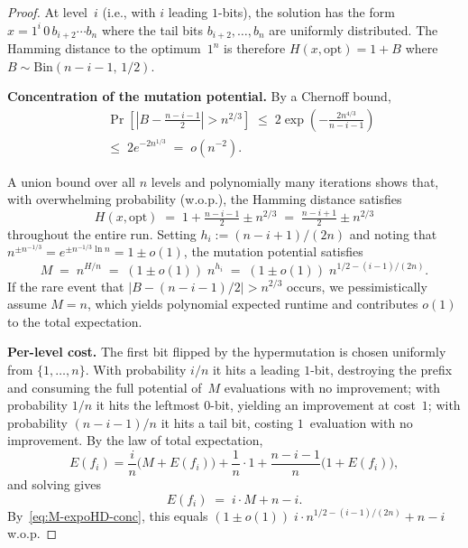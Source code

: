 \documentclass[lettersize,journal]{IEEEtran}
\begin{document}
\begin{proof}
At level~$i$ (i.e., with $i$ leading $1$-bits), the solution has the form
$x = 1^{i}\,0\,b_{i+2}\cdots b_n$ where the tail bits $b_{i+2},\dots,b_n$
are uniformly distributed.
The Hamming distance to the optimum~$1^n$ is therefore
$H(x,\text{opt}) = 1 + B$ where $B\sim\mathrm{Bin}(n-i-1,\,1/2)$.

\medskip
\noindent\textbf{Concentration of the mutation potential.}
By a Chernoff bound,
\begin{align*}
&\Pr\!\left[\left|B - \tfrac{n-i-1}{2}\right| > n^{2/3}\right]
\;\le\; 2\exp\!\left(-\frac{2n^{4/3}}{n-i-1}\right)
\\\;&\le\; 2e^{-2n^{1/3}}
\;=\; o(n^{-2}).
\end{align*}

A union bound over all $n$ levels and polynomially many iterations shows that,
with overwhelming probability (w.o.p.), the Hamming distance satisfies
\[
H(x,\text{opt})
\;=\; 1 + \tfrac{n-i-1}{2} \pm n^{2/3}
\;=\; \tfrac{n-i+1}{2} \pm n^{2/3}
\]
throughout the entire run.
Setting $h_i := (n-i+1)/(2n)$ and noting that
$n^{\pm n^{-1/3}} = e^{\pm n^{-1/3}\ln n} = 1 \pm o(1)$,
the mutation potential satisfies
\begin{equation}\label{eq:M-expoHD-conc}
M \;=\; n^{H/n}
  \;=\; (1\pm o(1))\;n^{h_i}
  \;=\; (1\pm o(1))\;n^{1/2-(i-1)/(2n)}.
\end{equation}
If the rare event that $|B - (n-i-1)/2| > n^{2/3}$ occurs, we
pessimistically assume $M=n$, which yields polynomial expected runtime and
contributes $o(1)$ to the total expectation.

\medskip
\noindent\textbf{Per-level cost.}
The first bit flipped by the hypermutation is chosen uniformly from
$\{1,\dots,n\}$.  With probability $i/n$ it hits a leading $1$-bit,
destroying the prefix and consuming the full potential of~$M$ evaluations
with no improvement; with probability $1/n$ it hits the leftmost $0$-bit,
yielding an improvement at cost~$1$; with probability $(n-i-1)/n$ it hits
a tail bit, costing $1$~evaluation with no improvement.
By the law of total expectation,
\[
E(f_i)
= \frac{i}{n}\bigl(M+E(f_i)\bigr)
  +\frac{1}{n}\cdot 1
  +\frac{n-i-1}{n}\bigl(1+E(f_i)\bigr),
\]
and solving gives
\begin{equation}\label{eq:Efi-expoHD}
E(f_i) \;=\; i\cdot M + n - i.
\end{equation}
By~\eqref{eq:M-expoHD-conc}, this equals
$(1\pm o(1))\;i\cdot n^{1/2-(i-1)/(2n)} + n - i$ w.o.p.


\end{proof}
\end{document}
